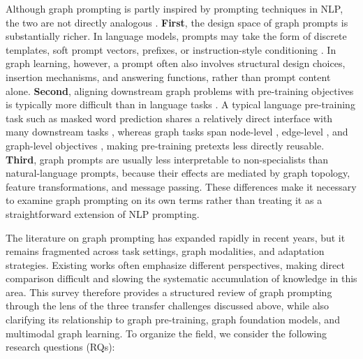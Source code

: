 Although graph prompting is partly inspired by prompting techniques in NLP, the two are not directly analogous \cite{sun2023all}. \textbf{First}, the design space of graph prompts is substantially richer. In language models, prompts may take the form of discrete templates, soft prompt vectors, prefixes, or instruction-style conditioning \cite{brown2020language, gao2021making}. In graph learning, however, a prompt often also involves structural design choices, insertion mechanisms, and answering functions, rather than prompt content alone. \textbf{Second}, aligning downstream graph problems with pre-training objectives is typically more difficult than in language tasks \cite{liu2023graphprompt, sun2023all}. A typical language pre-training task such as masked word prediction \cite{devlin2019bert} shares a relatively direct interface with many downstream tasks \cite{liu2023pretrain}, whereas graph tasks span node-level \cite{grover2016node2vec}, edge-level \cite{zhang2018link}, and graph-level objectives \cite{sun2020infograph, sun2021heterogeneous}, making pre-training pretexts less directly reusable. \textbf{Third}, graph prompts are usually less interpretable to non-specialists than natural-language prompts, because their effects are mediated by graph topology, feature transformations, and message passing. These differences make it necessary to examine graph prompting on its own terms rather than treating it as a straightforward extension of NLP prompting.




The literature on graph prompting has expanded rapidly in recent years, but it remains fragmented across task settings, graph modalities, and adaptation strategies. Existing works often emphasize different perspectives, making direct comparison difficult and slowing the systematic accumulation of knowledge in this area. This survey therefore provides a structured review of graph prompting through the lens of the three transfer challenges discussed above, while also clarifying its relationship to graph pre-training, graph foundation models, and multimodal graph learning. To organize the field, we consider the following research questions (RQs):

